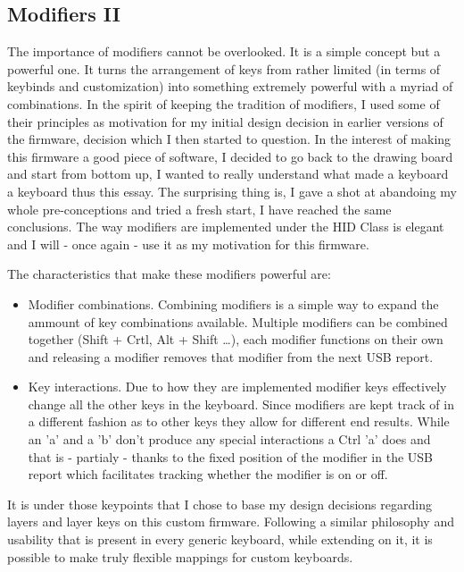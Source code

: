 \documentclass[11pt]{article}
\begin{document}
\subsection{Modifiers II}
\label{sec:orge53fdd9}
The importance of modifiers cannot be overlooked. It is a simple concept but a powerful one. It turns the arrangement of keys from rather limited (in terms of keybinds and customization) into something extremely powerful with a myriad of combinations. In the spirit of keeping the tradition of modifiers, I used some of their principles as motivation for my initial design decision in earlier versions of the firmware, decision which I then started to question. In the interest of making this firmware a good piece of software, I decided to go back to the drawing board and start from bottom up, I wanted to really understand what made a keyboard a keyboard thus this essay. The surprising thing is, I gave a shot at abandoing my whole pre-conceptions and tried a fresh start, I have reached the same conclusions. The way modifiers are implemented under the HID Class is elegant and I will - once again - use it as my motivation for this firmware. 

The characteristics that make these modifiers powerful are:

\begin{itemize}
\item Modifier combinations. Combining modifiers is a simple way to expand the ammount of key combinations available. Multiple modifiers can be combined together (Shift + Crtl, Alt + Shift \ldots{}), each modifier functions on their own and releasing a modifier removes that modifier from the next USB report.

\item Key interactions. Due to how they are implemented modifier keys effectively change all the other keys in the keyboard. Since modifiers are kept track of in a different fashion as to other keys they allow for different end results. While an 'a' and a 'b' don't produce any special interactions a Ctrl 'a' does and that is - partialy - thanks to the fixed position of the modifier in the USB report which facilitates tracking whether the modifier is on or off.
\end{itemize}

It is under those keypoints that I chose to base my design decisions regarding layers and layer keys on this custom firmware. Following a similar philosophy and usability that is present in every generic keyboard, while extending on it, it is possible to make truly flexible mappings for custom keyboards. 
\end{document}
